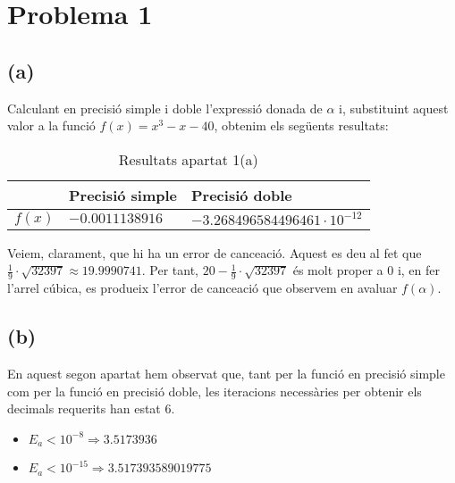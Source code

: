 \documentclass[11pt]{article}
\begin{document}
\section*{Problema 1}
	\subsection*{(a)}
	Calculant en precisió simple i doble l'expressió donada de $\alpha$ i, substituint aquest valor a la funció $f(x) = x^3 - x - 40$, obtenim els següents resultats:
	\begin{table}[H]
		\begin{center}
			\begin{tabular}[c]{|p{8mm}|p{26mm}|p{47mm}|}
			\hline 
			 & Precisió simple & Precisió doble \\ 
			\hline
			$f(x)$  
			& 
			$-0.0011138916$
			& 
			$-3.268496584496461 \cdot 10^{-12}$ \\
			\hline
			\end{tabular}
		\caption{Resultats apartat 1(a)}
		\end{center}
	\end{table}
	Veiem, clarament, que hi ha un error de cance\lgem ació. Aquest es deu al fet que $\frac{1}{9}\cdot \sqrt{32397} \approx 19.9990741. $ Per tant, $20 - \frac{1}{9}\cdot \sqrt{32397}$ és molt proper a 0 i, en fer l'arrel cúbica, es produeix l'error de cance\lgem ació que observem en avaluar $f(\alpha)$.
	\subsection*{(b)}
	En aquest segon apartat hem observat que, tant per la funció en precisió simple com per la funció en precisió doble, les iteracions necessàries per obtenir els decimals requerits han estat 6.
	\begin{itemize}
		\item $E_a < 10^{-8} \Longrightarrow 3.5173936$
		\item $E_a < 10^{-15} \Longrightarrow 3.517393589019775$
	\end{itemize}
\end{document}

